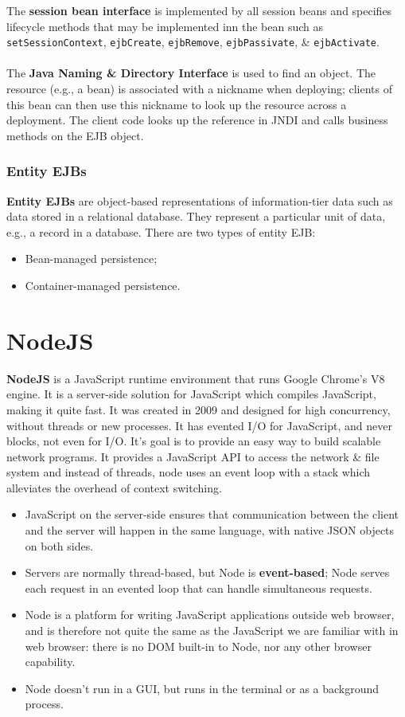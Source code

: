 \documentclass[a4paper,11pt]{article}
\begin{document}
The \textbf{session bean interface} is implemented by all session beans and specifies lifecycle methods that may be implemented inn the bean such as \texttt{setSessionContext}, \texttt{ejbCreate}, \texttt{ejbRemove}, \texttt{ejbPassivate}, \& \texttt{ejbActivate}.
\\\\
The \textbf{Java Naming \& Directory Interface} is used to find an object.
The resource (e.g., a bean) is associated with a nickname when deploying; clients of this bean can then use this nickname to look up the resource across a deployment.
The client code looks up the reference in JNDI and calls business methods on the EJB object.

\subsubsection{Entity EJBs}
\textbf{Entity EJBs} are object-based representations of information-tier data such as data stored in a relational database.
They represent a particular unit of data, e.g., a record in a database.
There are two types of entity EJB:
\begin{itemize}
    \item   Bean-managed persistence;
    \item   Container-managed persistence.
\end{itemize}

\section{NodeJS}
\textbf{NodeJS} is a JavaScript runtime environment that runs Google Chrome's V8 engine.
It is a server-side solution for JavaScript which compiles JavaScript, making it quite fast.
It was created in 2009 and designed for high concurrency, without threads or new processes.
It has evented I/O for JavaScript, and never blocks, not even for I/O.
It's goal is to provide an easy way to build scalable network programs.
It provides a JavaScript API to access the network \& file system and instead of threads, node uses an event loop with a stack which alleviates the overhead of context switching.
\begin{itemize}
    \item   JavaScript on the server-side ensures that communication between the client and the server will happen in the same language, with native JSON objects on both sides.
    \item   Servers are normally thread-based, but Node is \textbf{event-based}; Node serves each request in an evented loop that can handle simultaneous requests.
    \item   Node is a platform for writing JavaScript applications outside web browser, and is therefore not quite the same as the JavaScript we are familiar with in web browser: there is no DOM built-in to Node, nor any other browser capability.
    \item   Node doesn't run in a GUI, but runs in the terminal or as a background process.
\end{itemize}
\end{document}
